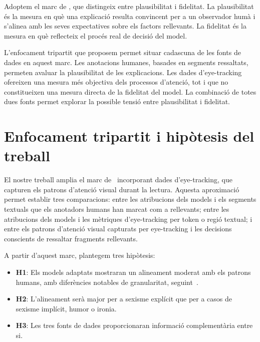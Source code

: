 Adoptem el marc de \textcite{jacovi2020towards}, que distingeix entre plausibilitat i fidelitat.
La plausibilitat és la mesura en què una explicació resulta convincent per a un observador humà i s'alinea amb les seves expectatives sobre els factors rellevants.
La fidelitat és la mesura en què reflecteix el procés real de decisió del model.

L'enfocament tripartit que proposem permet situar cadascuna de les fonts de dades en aquest marc.
Les anotacions humanes, basades en segments ressaltats, permeten avaluar la plausibilitat de les explicacions.
Les dades d'eye-tracking ofereixen una mesura més objectiva dels processos d'atenció, tot i que no constitueixen una mesura directa de la fidelitat del model.
La combinació de totes dues fonts permet explorar la possible tensió entre plausibilitat i fidelitat.

\section{Enfocament tripartit i hipòtesis del treball}

El nostre treball amplia el marc de~\textcite{bogaert_explanation_2026} incorporant dades d'eye-tracking, que capturen els patrons d'atenció visual durant la lectura.
Aquesta aproximació permet establir tres comparacions: entre les atribucions dels models i els segments textuals que els anotadors humans han marcat com a rellevants; entre les atribucions dels models i les mètriques d'eye-tracking per token o regió textual; i entre els patrons d'atenció visual capturats per eye-tracking i les decisions conscients de ressaltar fragments rellevants.

A partir d'aquest marc, plantegem tres hipòtesis:

\begin{itemize}
    \item \textbf{H1}: Els models adaptats mostraran un alineament moderat amb els patrons humans, amb diferències notables de granularitat, seguint~\textcite{bogaert_explanation_2026}.
    \item \textbf{H2}: L'alineament serà major per a sexisme explícit que per a casos de sexisme implícit, humor o ironia.
    \item \textbf{H3}: Les tres fonts de dades proporcionaran informació complementària entre si.
\end{itemize}
